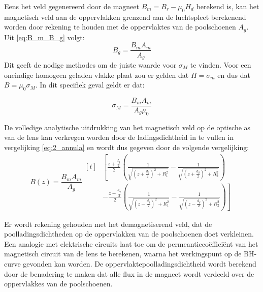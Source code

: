 \documentclass[we,twoside,openright,a4paper,11pt]{uantwerpenbamathesis}
\begin{document}
Eens het veld gegenereerd door de magneet $B_m=B_r-\mu_0 H_d$ berekend is, kan het magnetisch veld aan de oppervlakken grenzend aan de luchtspleet berekenend worden door rekening te houden met de oppervlaktes van de poolschoenen $A_g$. Uit \ref{eq:B_m_B_g} volgt:
\begin{equation}\label{eq:Br_yoke}
    B_g = \frac{B_m A_m}{A_g}
\end{equation}
Dit geeft de nodige methodes om de juiste waarde voor $\sigma_M$ te vinden. Voor een oneindige homogeen geladen vlakke plaat zou er gelden dat $H = \sigma_m$ en dus dat $B = \mu_0 \sigma_M$. In dit specifiek geval geldt er dat:

\begin{equation}\label{eq:charge_density}
    \sigma_M = \frac{B_m A_m}{A_g \mu_0}
\end{equation}

De volledige analytische uitdrukking van het magnetisch veld op de optische as van de lens kan verkregen worden door de ladingsdichtheid in te vullen in vergelijking \ref{eq:2_annula} en wordt dus gegeven door de volgende vergelijking:\small
\begin{equation}\label{eq:analytical_B_field_final}
    B(z) = \frac{B_m A_m}{A_g}
    \begin{aligned}[t]
        &\left[ \frac{z+\frac{d_g}{2}}{2}\left(\frac{1}{\sqrt{\left(z+\frac{d_g}{2}\right)^2+R_1^2}}-\frac{1}{\sqrt{\left(z+\frac{d_g}{2}\right)^2+R_2^2}}\right)\right.\\
        &\left.- \frac{z-\frac{d_g}{2}}{2}\left(\frac{1}{\sqrt{\left(z-\frac{d_g}{2}\right)^2+R_1^2}}-\frac{1}{\sqrt{\left(z-\frac{d_g}{2}\right)^2+R_2^2}}\right)\right]
    \end{aligned}
\end{equation}

\begin{tcolorbox}[colback=blue!10!white,colframe=blue!75!black,title=Realisatie objectief 3]
    Er wordt rekening gehouden met het demagnetiserend veld, dat de poolladingsdichtheden op de oppervlakken van de poolschoenen doet verkleinen. Een analogie met elektrische circuits laat toe om de permeantiecoëfficiënt van het magnetisch circuit van de lens te berekenen, waarna het werkingspunt op de $\mathrm{BH}$-curve gevonden kan worden. De oppervlaktepoolladingsdichtheid wordt berekend door de benadering te maken dat alle flux in de magneet wordt verdeeld over de oppervlakkes van de poolschoenen.
\end{tcolorbox}
\end{document}
